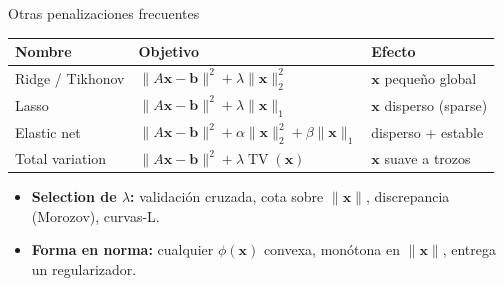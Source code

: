 \documentclass[10pt,aspectratio=169]{beamer}
\newcommand{\x}{\mathbf{x}}
\newcommand{\xb}{\mathbf{b}}
\newcommand{\0}{\mathbf{0}}
\newcommand{\1}{\mathbf{1}}
\begin{document}
\begin{frame}{Otras penalizaciones frecuentes}
  \begin{center}
    \begin{tabular}{lll}
      \toprule
      Nombre & Objetivo & Efecto \\
      \midrule
      Ridge / Tikhonov & $\|A\x-\xb\|^2 + \lambda\|\x\|_2^2$ & $\x$ pequeño global \\
      Lasso & $\|A\x-\xb\|^2 + \lambda\|\x\|_1$ & $\x$ disperso (sparse) \\
      Elastic net & $\|A\x-\xb\|^2 + \alpha\|\x\|_2^2 + \beta\|\x\|_1$ & disperso + estable \\
      Total variation & $\|A\x-\xb\|^2 + \lambda\operatorname{TV}(\x)$ & $\x$ suave a trozos \\
      \bottomrule
    \end{tabular}
  \end{center}
  \begin{itemize}
    \item \textbf{Selection de $\lambda$:} validación cruzada, cota sobre $\|\x\|$,
          discrepancia (Morozov), curvas-L.
    \item \textbf{Forma en norma:} cualquier $\phi(\x)$ convexa, monótona en
          $\|\x\|$, entrega un regularizador.
  \end{itemize}
\end{frame}
\end{document}
